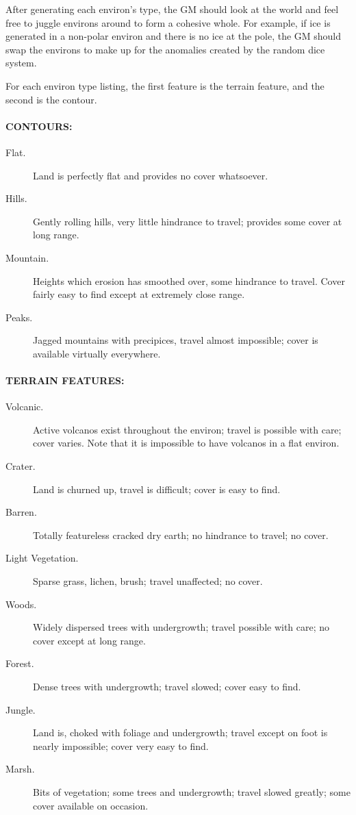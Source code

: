 After generating each environ's type, the GM should look at the world
and feel free to juggle environs around to form a cohesive whole.  For
example, if ice is generated in a non-polar environ and there is no
ice at the pole, the GM should swap the environs to make up for the
anomalies created by the random dice system.

For each environ type listing, the first feature is the terrain
feature, and the second is the contour.


\paragraph{CONTOURS:}

\begin{description}
\item[Flat.] Land is perfectly flat and provides no cover whatsoever.
\item[Hills.] Gently rolling hills, very little hindrance to travel;
  provides some cover at long range.
\item[Mountain.] Heights which erosion has smoothed over, some
  hindrance to travel. Cover fairly easy to find except at extremely
  close range.
\item[Peaks.] Jagged mountains with precipices, travel almost
  impossible; cover is available virtually everywhere.
\end{description}


\paragraph{TERRAIN FEATURES:}

\begin{description}
\item[Volcanic.] Active volcanos exist throughout the environ; travel
  is possible with care; cover varies. Note that it is impossible to
  have volcanos in a flat environ.
\item[Crater.] Land is churned up, travel is difficult; cover is easy
  to find.
\item[Barren.] Totally featureless cracked dry earth; no hindrance to
  travel; no cover.
\item[Light Vegetation.] Sparse grass, lichen, brush; travel
  unaffected; no cover.
\item[Woods.] Widely dispersed trees with undergrowth; travel possible
  with care; no cover except at long range.
\item[Forest.] Dense trees with undergrowth; travel slowed; cover easy
  to find.
\item[Jungle.] Land is, choked with foliage and undergrowth; travel
  except on foot is nearly impossible; cover very easy to find.
\item[Marsh.] Bits of vegetation; some trees and undergrowth; travel
  slowed greatly; some cover available on occasion.
\end{description}


